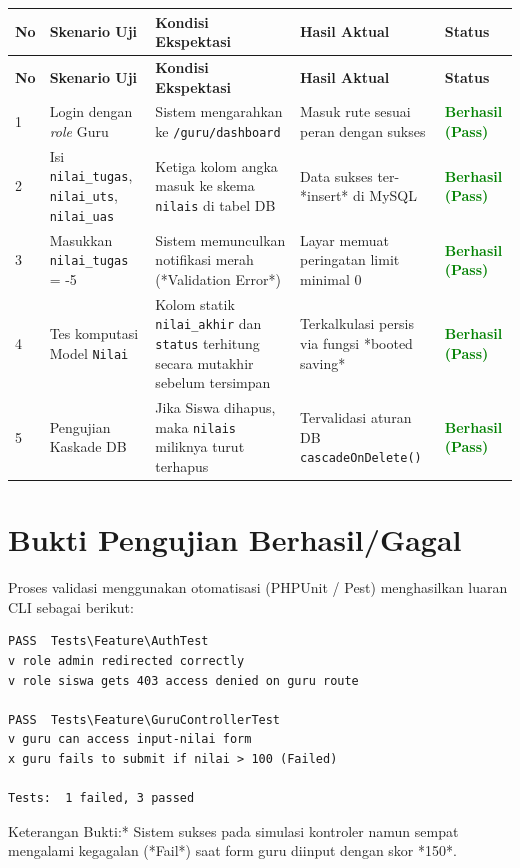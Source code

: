 \documentclass[12pt, a4paper]{article}
\newcommand{\statuspass}{\textcolor{green}{\textbf{Berhasil (Pass)}}}
\begin{document}
\renewcommand{\arraystretch}{1.5}
\begin{longtable}{|p{0.5cm}|p{3.5cm}|p{4cm}|p{3.5cm}|p{2.5cm}|}
\hline
\textbf{No} & \textbf{Skenario Uji} & \textbf{Kondisi Ekspektasi} & \textbf{Hasil Aktual} & \textbf{Status} \\ \hline
\endfirsthead
\hline
\textbf{No} & \textbf{Skenario Uji} & \textbf{Kondisi Ekspektasi} & \textbf{Hasil Aktual} & \textbf{Status} \\ \hline
\endhead

1 & Login dengan \textit{role} Guru & Sistem mengarahkan ke \texttt{/guru/dashboard} & Masuk rute sesuai peran dengan sukses & \statuspass \\ \hline
2 & Isi \texttt{nilai\_tugas}, \texttt{nilai\_uts}, \texttt{nilai\_uas} & Ketiga kolom angka masuk ke skema \texttt{nilais} di tabel DB & Data sukses ter-*insert* di MySQL & \statuspass \\ \hline
3 & Masukkan \texttt{nilai\_tugas} = -5 & Sistem memunculkan notifikasi merah (*Validation Error*) & Layar memuat peringatan limit minimal $0$ & \statuspass \\ \hline
4 & Tes komputasi Model \texttt{Nilai} & Kolom statik \texttt{nilai\_akhir} dan \texttt{status} terhitung secara mutakhir sebelum tersimpan & Terkalkulasi persis via fungsi *booted saving* & \statuspass \\ \hline
5 & Pengujian Kaskade DB & Jika Siswa dihapus, maka \texttt{nilais} miliknya turut terhapus & Tervalidasi aturan DB \texttt{cascadeOnDelete()} & \statuspass \\ \hline
\end{longtable}

\section{Bukti Pengujian Berhasil/Gagal}
Proses validasi menggunakan otomatisasi (PHPUnit / Pest) menghasilkan luaran CLI sebagai berikut:
\begin{verbatim}
PASS  Tests\Feature\AuthTest
v role admin redirected correctly
v role siswa gets 403 access denied on guru route

PASS  Tests\Feature\GuruControllerTest
v guru can access input-nilai form
x guru fails to submit if nilai > 100 (Failed)

Tests:  1 failed, 3 passed
\end{verbatim}

\noindent *Keterangan Bukti:* Sistem sukses pada simulasi kontroler namun sempat mengalami kegagalan (*Fail*) saat form guru diinput dengan skor *150*.
\end{document}
